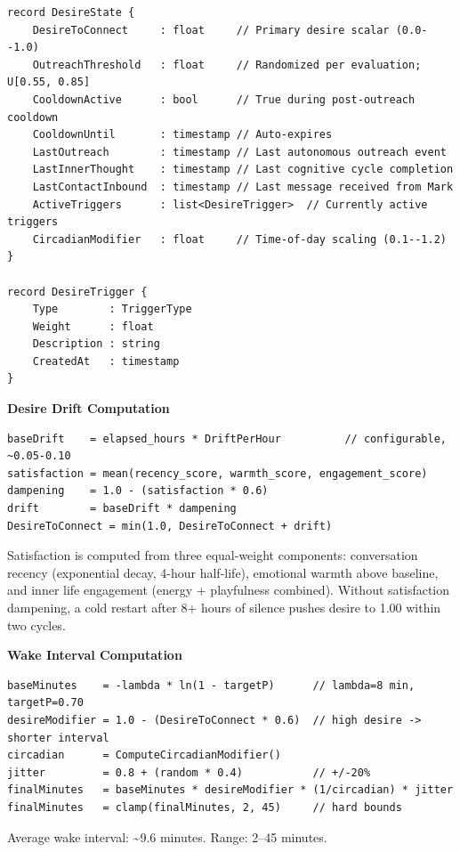 \documentclass[12pt]{article}
\begin{document}
\begin{verbatim}
record DesireState {
    DesireToConnect     : float     // Primary desire scalar (0.0--1.0)
    OutreachThreshold   : float     // Randomized per evaluation; U[0.55, 0.85]
    CooldownActive      : bool      // True during post-outreach cooldown
    CooldownUntil       : timestamp // Auto-expires
    LastOutreach        : timestamp // Last autonomous outreach event
    LastInnerThought    : timestamp // Last cognitive cycle completion
    LastContactInbound  : timestamp // Last message received from Mark
    ActiveTriggers      : list<DesireTrigger>  // Currently active triggers
    CircadianModifier   : float     // Time-of-day scaling (0.1--1.2)
}

record DesireTrigger {
    Type        : TriggerType
    Weight      : float
    Description : string
    CreatedAt   : timestamp
}
\end{verbatim}

\textbf{Desire Drift Computation}

\begin{verbatim}
baseDrift    = elapsed_hours * DriftPerHour          // configurable, ~0.05-0.10
satisfaction = mean(recency_score, warmth_score, engagement_score)
dampening    = 1.0 - (satisfaction * 0.6)
drift        = baseDrift * dampening
DesireToConnect = min(1.0, DesireToConnect + drift)
\end{verbatim}

Satisfaction is computed from three equal-weight components:
conversation recency (exponential decay, 4-hour half-life), emotional
warmth above baseline, and inner life engagement (energy + playfulness
combined). Without satisfaction dampening, a cold restart after 8+ hours
of silence pushes desire to 1.00 within two cycles.

\textbf{Wake Interval Computation}

\begin{verbatim}
baseMinutes    = -lambda * ln(1 - targetP)      // lambda=8 min, targetP=0.70
desireModifier = 1.0 - (DesireToConnect * 0.6)  // high desire -> shorter interval
circadian      = ComputeCircadianModifier()
jitter         = 0.8 + (random * 0.4)           // +/-20%
finalMinutes   = baseMinutes * desireModifier * (1/circadian) * jitter
finalMinutes   = clamp(finalMinutes, 2, 45)     // hard bounds
\end{verbatim}

Average wake interval: \textasciitilde9.6 minutes. Range: 2--45 minutes.
\end{document}
